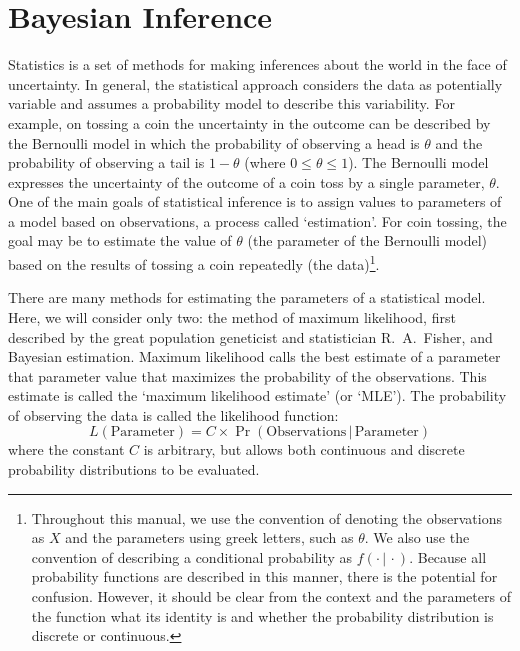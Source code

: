 \documentclass{article}
\newcommand{\given}{\,|\,}
\begin{document}
\section*{Bayesian Inference}

Statistics is a set of methods for making inferences about the world in the face of uncertainty.
In general, the statistical approach considers the data as potentially variable and assumes a 
probability model to describe this variability. 
For example, on tossing a coin the uncertainty in the 
outcome can be described by the Bernoulli model in which the 
probability of observing a head is $\theta$ and the probability of observing a tail is $1 - \theta$ 
(where $0 \leq \theta \leq 1$). 
The Bernoulli model expresses the uncertainty of the outcome of a coin toss by a single parameter, $\theta$. 
One of the main goals of statistical inference is to assign values to parameters of a model based on observations,
a process called `estimation'. 
For coin tossing, the goal may be to estimate the value of $\theta$ (the 
parameter of the Bernoulli model) based on the results of tossing a coin repeatedly 
(the data)\footnote{Throughout this manual, we use the convention of denoting the observations as $X$ and the parameters using greek letters,
such as $\theta$.
We also use the convention of describing a conditional probability as $f(\cdot \given \cdot)$. Because all probability  functions
are described in this manner, there is the potential for confusion. However, it should be clear
from the context and the parameters of the function what its identity is and whether the
probability distribution is  discrete or continuous.}. 

There are many methods for estimating the parameters of a statistical model. Here, we will consider only two: 
the method of maximum likelihood, first described by the great population geneticist and statistician R.\ A.\ Fisher, and 
Bayesian estimation. Maximum likelihood calls the best estimate of a parameter that parameter value that maximizes the probability
of the observations. This estimate is called the `maximum likelihood estimate' (or `MLE').
The probability of observing the data is called the likelihood function:
$$
L(\mbox{Parameter}) = C \times \Pr(\mbox{Observations} \given \mbox{Parameter})
$$
where the constant $C$ is arbitrary, but allows both continuous and discrete probability distributions to be evaluated.
\end{document}
